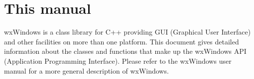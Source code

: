 \chapter{This manual}
%
%
\setfooter{\thepage}{}{}{}{}{\thepage}

wxWindows is a class library for C++ providing GUI (Graphical User
Interface) and other facilities on more than one platform. This document
gives detailed information about the classes and functions that make up
the wxWindows API (Application Programming Interface).  Please refer to the
wxWindows user manual for a more general description of wxWindows.





%
\setfooter{\thepage}{}{}{}{}{\thepage}
\printindex



